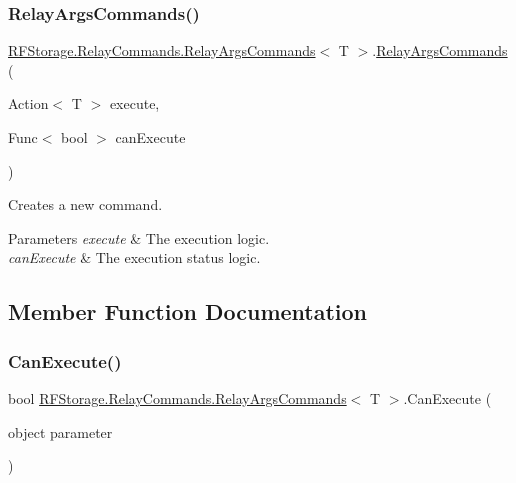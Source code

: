 \subsubsection{\texorpdfstring{RelayArgsCommands()}{RelayArgsCommands()}\hspace{0.1cm}{\footnotesize\ttfamily [2/2]}}
{\footnotesize\ttfamily \mbox{\hyperlink{class_r_f_storage_1_1_relay_commands_1_1_relay_args_commands}{R\+F\+Storage.\+Relay\+Commands.\+Relay\+Args\+Commands}}$<$ T $>$.\mbox{\hyperlink{class_r_f_storage_1_1_relay_commands_1_1_relay_args_commands}{Relay\+Args\+Commands}} (\begin{DoxyParamCaption}\item[{Action$<$ T $>$}]{execute,  }\item[{Func$<$ bool $>$}]{can\+Execute }\end{DoxyParamCaption})}



Creates a new command. 


\begin{DoxyParams}{Parameters}
{\em execute} & The execution logic.\\
\hline
{\em can\+Execute} & The execution status logic.\\
\hline
\end{DoxyParams}


\subsection{Member Function Documentation}
\mbox{\label{class_r_f_storage_1_1_relay_commands_1_1_relay_args_commands_a2c2ee8921125d98ddae9f72e26b9f589}} 
\subsubsection{\texorpdfstring{CanExecute()}{CanExecute()}}
{\footnotesize\ttfamily bool \mbox{\hyperlink{class_r_f_storage_1_1_relay_commands_1_1_relay_args_commands}{R\+F\+Storage.\+Relay\+Commands.\+Relay\+Args\+Commands}}$<$ T $>$.Can\+Execute (\begin{DoxyParamCaption}\item[{object}]{parameter }\end{DoxyParamCaption})}



